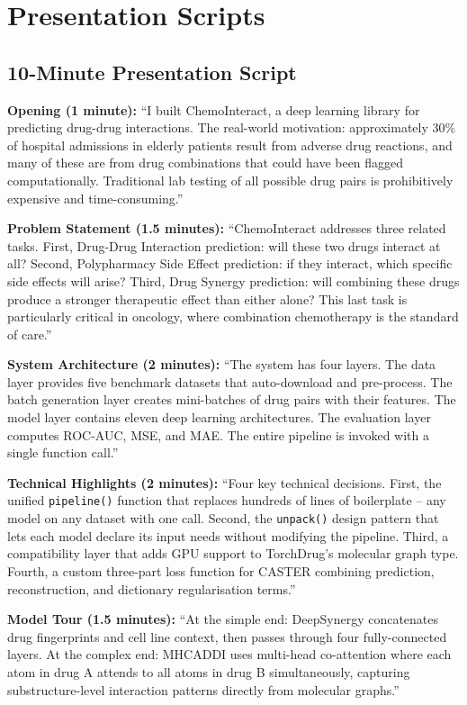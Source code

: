 \documentclass[12pt,a4paper,oneside]{book}
\begin{document}
\chapter{Presentation Scripts}\label{chap:presentation}

\section{10-Minute Presentation Script}

\textbf{Opening (1 minute):}
``I built ChemoInteract, a deep learning library for predicting drug-drug interactions. The real-world motivation: approximately 30\% of hospital admissions in elderly patients result from adverse drug reactions, and many of these are from drug combinations that could have been flagged computationally. Traditional lab testing of all possible drug pairs is prohibitively expensive and time-consuming.''

\textbf{Problem Statement (1.5 minutes):}
``ChemoInteract addresses three related tasks. First, Drug-Drug Interaction prediction: will these two drugs interact at all? Second, Polypharmacy Side Effect prediction: if they interact, which specific side effects will arise? Third, Drug Synergy prediction: will combining these drugs produce a stronger therapeutic effect than either alone? This last task is particularly critical in oncology, where combination chemotherapy is the standard of care.''

\textbf{System Architecture (2 minutes):}
``The system has four layers. The data layer provides five benchmark datasets that auto-download and pre-process. The batch generation layer creates mini-batches of drug pairs with their features. The model layer contains eleven deep learning architectures. The evaluation layer computes ROC-AUC, MSE, and MAE. The entire pipeline is invoked with a single function call.''

\textbf{Technical Highlights (2 minutes):}
``Four key technical decisions. First, the unified \texttt{pipeline()} function that replaces hundreds of lines of boilerplate -- any model on any dataset with one call. Second, the \texttt{unpack()} design pattern that lets each model declare its input needs without modifying the pipeline. Third, a compatibility layer that adds GPU support to TorchDrug's molecular graph type. Fourth, a custom three-part loss function for CASTER combining prediction, reconstruction, and dictionary regularisation terms.''

\textbf{Model Tour (1.5 minutes):}
``At the simple end: DeepSynergy concatenates drug fingerprints and cell line context, then passes through four fully-connected layers. At the complex end: MHCADDI uses multi-head co-attention where each atom in drug A attends to all atoms in drug B simultaneously, capturing substructure-level interaction patterns directly from molecular graphs.''
\end{document}
